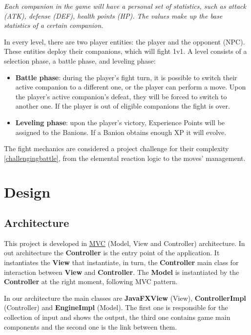 \documentclass[12pt, a4paper]{report}
\begin{document}
    \textit{Each companion in the game will have a personal set of statistics, such as attack (ATK), defense (DEF), health points (HP).
    The values make up the base statistics of a certain companion.}

    In every level, there are two player entities: the player and the opponent (NPC). These entities deploy their companions, which will fight 1v1.
    A level consists of a selection phase, a battle phase, and leveling phase:
\begin{itemize}
    \item \textbf{Battle phase}: during the player's fight turn, it is possible to switch their active companion to a different one, 
        or the player can perform a move. Upon the player's active companion's defeat, they will be forced to switch to another one. 
        If the player is out of eligible companions the fight is over.
    \item \textbf{Leveling phase}: upon the player's victory, Experience Points will be assigned to the Banions. If a Banion obtains enough XP it will evolve.
\end{itemize}

    The fight mechanics are considered a project challenge for their complexity \ref{challengingbattle}, from the elemental reaction logic to the moves' management.

\chapter{Design}

\section{Architecture}

    This project is developed in \href{https://en.wikipedia.org/wiki/Model%E2%80%93view%E2%80%93controller}{MVC} (Model, View and Controller) architecture.
    In out architecture the \textbf{Controller} is the entry point of the application. It instantiates the \textbf{View} that instantiate, in turn, the
    \textbf{Controller} main class for interaction between \textbf{View} and \textbf{Controller}. The \textbf{Model} is instantiated by the \textbf{Controller}
    at the right moment, following MVC pattern.

    In our architecture the main classes are \textbf{JavaFXView} (View), \textbf{ControllerImpl} (Controller) and \textbf{EngineImpl} (Model). The
    first one is responsible for the collection of input and shows the output, the third one contains game main components and the second one is the link between them.
\end{document}
